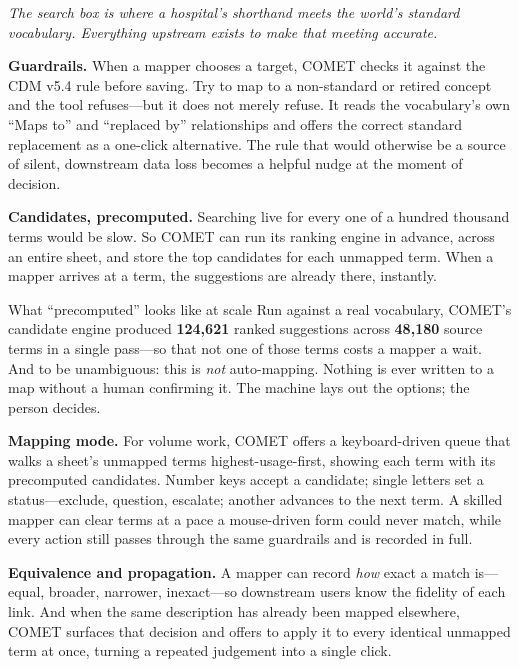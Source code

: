 \documentclass[12pt,openany]{book}
\newcommand{\pullquote}[1]{%
  \begin{center}\smallskip
  {\sffamily\itshape\large\color{cometbrown} #1}\smallskip\end{center}}
\begin{document}
\pullquote{The search box is where a hospital's shorthand meets the world's standard vocabulary.
Everything upstream exists to make that meeting accurate.}

\textbf{Guardrails.} When a mapper chooses a target, COMET checks it against the CDM v5.4 rule before
saving. Try to map to a non-standard or retired concept and the tool refuses---but it does not merely
refuse. It reads the vocabulary's own ``Maps to'' and ``replaced by'' relationships and offers the
correct standard replacement as a one-click alternative. The rule that would otherwise be a source of
silent, downstream data loss becomes a helpful nudge at the moment of decision.

\textbf{Candidates, precomputed.} Searching live for every one of a hundred thousand terms would be
slow. So COMET can run its ranking engine in advance, across an entire sheet, and store the top
candidates for each unmapped term. When a mapper arrives at a term, the suggestions are already there,
instantly.

\begin{practice}{What ``precomputed'' looks like at scale}
Run against a real vocabulary, COMET's candidate engine produced \textbf{124{,}621} ranked suggestions
across \textbf{48{,}180} source terms in a single pass---so that not one of those terms costs a mapper
a wait. And to be unambiguous: this is \emph{not} auto-mapping. Nothing is ever written to a map
without a human confirming it. The machine lays out the options; the person decides.
\end{practice}

\textbf{Mapping mode.} For volume work, COMET offers a keyboard-driven queue that walks a sheet's
unmapped terms highest-usage-first, showing each term with its precomputed candidates. Number keys
accept a candidate; single letters set a status---exclude, question, escalate; another advances to the
next term. A skilled mapper can clear terms at a pace a mouse-driven form could never match, while
every action still passes through the same guardrails and is recorded in full.

\textbf{Equivalence and propagation.} A mapper can record \emph{how} exact a match is---equal, broader,
narrower, inexact---so downstream users know the fidelity of each link. And when the same description
has already been mapped elsewhere, COMET surfaces that decision and offers to apply it to every
identical unmapped term at once, turning a repeated judgement into a single click.
\end{document}
